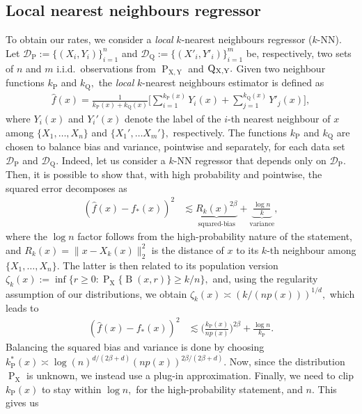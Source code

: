 \documentclass[10pt]{article}
\newcommand{\mD}{\mathcal{D}}
\newcommand{\B}{\operatorname{B}}
\renewcommand{\P}{\operatorname{P}}
\newcommand{\Q}{\operatorname{Q}}
\newcommand{\X}{\operatorname{X}}
\newcommand{\wh}{\widehat}
\newcommand{\sY}{\mathrm{Y}}
\newcommand{\sX}{\mathrm{X}}
\begin{document}
\subsection{Local nearest neighbours regressor}
\label{sec.4.2}

To obtain our rates, we consider a \textit{local} $k$-nearest neighbours regressor ($k$-NN). Let $\mD_{\P} := \{(X_i, Y_i)\}_{i = 1}^n$ and $\mD_{\Q} := \{(X'_i, Y'_i)\}_{i=1}^m$ be, respectively, two sets of $n$ and $m$ i.i.d.\ observations from $\P_{\sX, \sY}$ and $\Q\mathstrut_{\!\X, \sY}.$ Given two neighbour functions $k_{\P}$ and $k_{\Q},$ the \textit{local} $k$-nearest neighbours estimator is defined as
\begin{align}
    \label{eq.two.sample.local.knn}
    \wh f(x) = \frac{1}{k_{\P}(x) + k_{\Q}(x)}\Bigg[\sum_{i=1}^{k_{\P}(x)} Y_i(x) + \sum_{j=1}^{k_{\Q}(x)} Y'_j(x)\Bigg],
\end{align}
where $Y_i(x)$ and $Y_i'(x)$ denote the label of the $i$-th nearest neighbour of $x$ among $\{X_1, \dots, X_n\}$ and $\{X_1', \dots X_m'\},$ respectively. The functions $k_{\P}$ and $k_{\Q}$ are chosen to balance bias and variance, pointwise and separately, for each data set $\mD_{\P}$ and $\mD_{\Q}.$ Indeed, let us consider a $k$-NN regressor that depends only on $\mD_{\P}.$ Then, it is possible to show that, with high probability and pointwise, the squared error decomposes as
\begin{align*}
    (\wh f(x) - f_*(x))^2 &\lesssim \underbrace{R_k(x)^{2\beta}}_{\text{squared-bias}} + \underbrace{\frac{\log n}{k}}_{\text{variance}},
\end{align*}
where the $\log n$ factor follows from the high-probability nature of the statement, and $R_k(x) = \|x - X_k(x)\|_2^2$ is the distance of $x$ to its $k$-th neighbour among $\{X_1, \dots, X_n\}.$ The latter is then related to its population version $\zeta_{k}(x) := \inf\{r\geq 0: \P_{\sX}\{\B(x, r)\} \geq k/n\},$ and, using the regularity assumption of our distributions, we obtain $\zeta_k(x) \asymp (k/(np(x)))^{1/d},$ which leads to
\begin{align*}
    (\wh f(x) - f_*(x))^2 &\lesssim \bigg(\frac{k_{\P}(x)}{np(x)}\bigg)^{2\beta} + \frac{\log n}{k_{\P}}.
\end{align*}
Balancing the squared bias and variance is done by choosing $k_{\P}^*(x) \asymp \log(n)^{d/(2\beta + d)}(np(x))^{2\beta/(2\beta + d)}.$ Now, since the distribution $\P_{\sX}$ is unknown, we instead use a plug-in approximation. Finally, we need to clip $k_{\P}(x)$ to stay within $\log n,$ for the high-probability statement, and $n.$ This gives us
\end{document}
